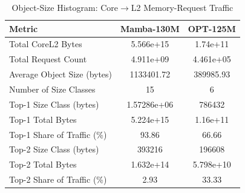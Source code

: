 \begin{table}[h]\centering
    \caption{Object-Size Histogram: Core$\rightarrow$L2 Memory-Request Traffic}
    \label{tab:object_histogram}
    \begin{tabular}{lcc}\hline
    Metric & Mamba-130M & OPT-125M \\\hline
        Total Core\textrightarrow{}L2 Bytes & 5.566e+15 & 1.74e+11 \\
    Total Request Count & 4.911e+09 & 4.461e+05 \\
    Average Object Size (bytes) & 1133401.72 & 389985.93 \\
    Number of Size Classes & 15 & 6 \\
    Top-1 Size Class (bytes) & 1.57286e+06 & 786432 \\
    Top-1 Total Bytes & 5.224e+15 & 1.16e+11 \\
    Top-1 Share of Traffic (\%) & 93.86 & 66.66 \\
    Top-2 Size Class (bytes) & 393216 & 196608 \\
    Top-2 Total Bytes & 1.632e+14 & 5.798e+10 \\
    Top-2 Share of Traffic (\%) & 2.93 & 33.33 \\
\hline\end{tabular}\end{table}